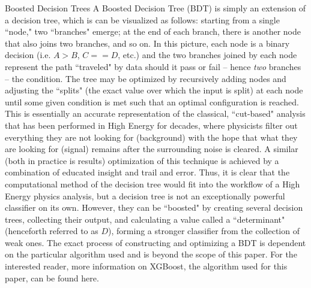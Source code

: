 \begin{section}{Boosted Decision Trees}
A Boosted Decision Tree (BDT) is simply an extension of a decision tree, which is can be visualized as follows: starting from a single ``node," two ``branches" emerge; at the end of each branch, there is another node that also joins two branches, and so on. In this picture, each node is a binary decision (i.e. $A > B$, $C == D$, etc.) and the two branches joined by each node represent the path ``traveled" by data should it pass or fail -- hence \textit{two} branches -- the condition. The tree may be optimized by recursively adding nodes and adjusting the ``splits" (the exact value over which the input is split) at each node until some given condition is met such that an optimal configuration is reached. This is essentially an accurate representation of the classical, ``cut-based" analysis that has been performed in High Energy for decades, where physicists filter out everything they are not looking for (background) with the hope that what they are looking for (signal) remains after the surrounding noise is cleared. A similar (both in practice is results) optimization of this technique is achieved by a combination of educated insight and trail and error. Thus, it is clear that the computational method of the decision tree would fit into the workflow of a High Energy physics analysis, but a decision tree is not an exceptionally powerful classifier on its own. However, they can be ``boosted" by creating several decision trees, collecting their output, and calculating a value called a ``determinant" (henceforth referred to as $D$), forming a stronger classifier from the collection of weak ones. The exact process of constructing and optimizing a BDT is dependent on the particular algorithm used and is beyond the scope of this paper. For the interested reader, more information on XGBoost, the algorithm used for this paper, can be found here\cite{cite-xgboost}.
\end{section}